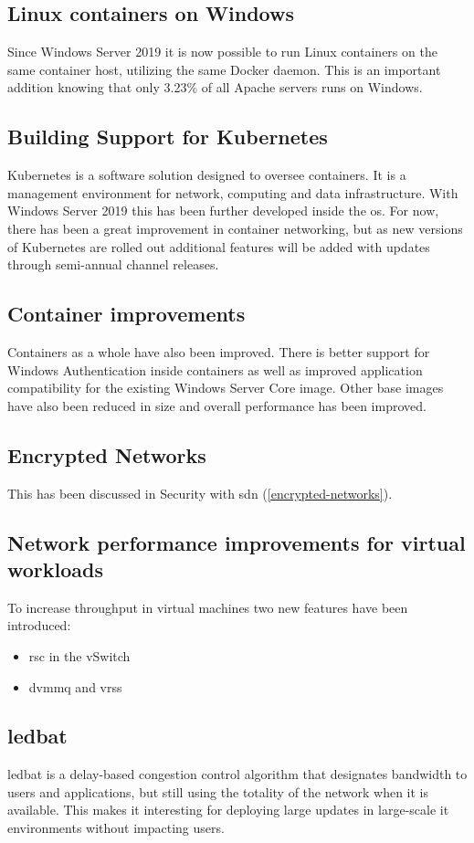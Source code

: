 \subsection*{Linux containers on Windows}
Since Windows Server 2019 it is now possible to run Linux containers on the same container host, utilizing the same Docker daemon. This is an important addition knowing that only 3.23\% of all Apache servers runs on Windows. \autocite{SecuritySpace2019}
\subsection*{Building Support for Kubernetes}
Kubernetes is a software solution designed to oversee containers. It is a management environment for network, computing and data infrastructure. With Windows Server 2019 this has been further developed inside the \acrshort{os}. For now, there has been a great improvement in container networking, but as new versions of Kubernetes are rolled out additional features will be added with updates through semi-annual channel releases.
\subsection*{Container improvements}
Containers as a whole have also been improved. There is better support for Windows Authentication inside containers as well as improved application compatibility for the existing Windows Server Core image. Other base images have also been reduced in size and overall performance has been improved.
\subsection*{Encrypted Networks}
This has been discussed in Security with \acrshort{sdn} (\ref{encrypted-networks}).
\subsection*{Network performance improvements for virtual workloads}
To increase throughput in virtual machines two new features have been introduced:
\begin{itemize}
	\item \acrfull{rsc} in the vSwitch
	\item \acrfull{dvmmq} and \acrfull{vrss}
\end{itemize}
\subsection*{\acrfull{ledbat}}
\acrshort{ledbat} is a delay-based congestion control algorithm that designates bandwidth to users and applications, but still using the totality of the network when it is available. \autocite{Shalunov2012}
This makes it interesting for deploying large updates in large-scale \acrshort{it} environments without impacting users.
